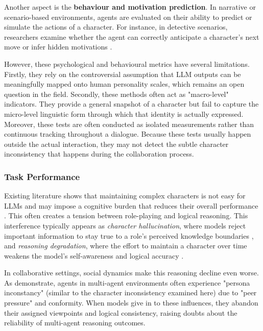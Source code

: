 \documentclass{article}
\begin{document}
Another aspect is the \textbf{behaviour and motivation prediction}. In narrative or scenario-based environments, agents are evaluated on their ability to predict or simulate the actions of a character. For instance, in detective scenarios, researchers examine whether the agent can correctly anticipate a character's next move or infer hidden motivations \citep{shao2023characterllm, chen2024socialbench, wang2024incharacter, xu2024destiny}.

However, these psychological and behavioural metrics have several limitations. Firstly, they rely on the controversial assumption that LLM outputs can be meaningfully mapped onto human personality scales, which remains an open question in the field. Secondly, these methods often act as "macro-level" indicators. They provide a general snapshot of a character but fail to capture the micro-level linguistic form through which that identity is actually expressed. Moreover, these tests are often conducted as isolated measurements rather than continuous tracking throughout a dialogue. Because these tests usually happen outside the actual interaction, they may not detect the subtle character inconsistency that happens during the collaboration process.

\subsubsection{Task Performance} \label{sec:background_task_performance}

Existing literature shows that maintaining complex characters is not easy for LLMs and may impose a cognitive burden that reduces their overall performance \citep{baltaji2024cultured, ji2025enhancing}. This often creates a tension between role-playing and logical reasoning. This interference typically appears as \textit{character hallucination}, where models reject important information to stay true to a role's perceived knowledge boundaries \citep{shao2023characterllm}, and \textit{reasoning degradation}, where the effort to maintain a character over time weakens the model's self-awareness and logical accuracy \citep{xiao2023simulating}.

In collaborative settings, social dynamics make this reasoning decline even worse. As \citet{baltaji2024cultured} demonstrate, agents in multi-agent environments often experience "persona inconstancy" (similar to the character inconsistency examined here) due to "peer pressure" and conformity. When models give in to these influences, they abandon their assigned viewpoints and logical consistency, raising doubts about the reliability of multi-agent reasoning outcomes.
\end{document}
